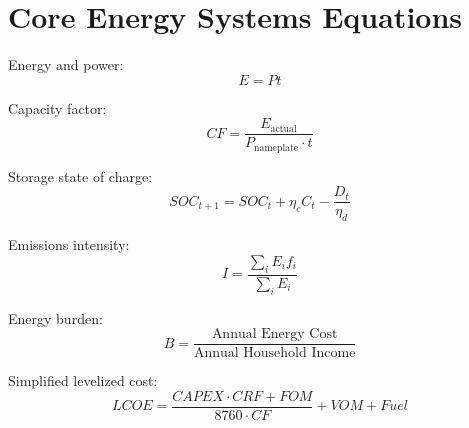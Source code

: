 \documentclass{article}
\begin{document}
\section*{Core Energy Systems Equations}

Energy and power:
\[
E = P t
\]

Capacity factor:
\[
CF = \frac{E_{\text{actual}}}{P_{\text{nameplate}} \cdot t}
\]

Storage state of charge:
\[
SOC_{t+1} = SOC_t + \eta_c C_t - \frac{D_t}{\eta_d}
\]

Emissions intensity:
\[
I = \frac{\sum_i E_i f_i}{\sum_i E_i}
\]

Energy burden:
\[
B = \frac{\text{Annual Energy Cost}}{\text{Annual Household Income}}
\]

Simplified levelized cost:
\[
LCOE = \frac{CAPEX \cdot CRF + FOM}{8760 \cdot CF} + VOM + Fuel
\]
\end{document}
